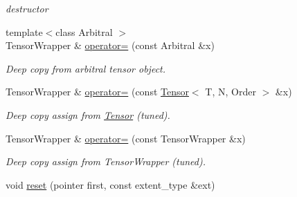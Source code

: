 \begin{DoxyCompactItemize}
\begin{DoxyCompactList}\small\item\em destructor \item\end{DoxyCompactList}\item 
\hypertarget{classbtas_1_1_tensor_wrapper_3_01_t_01_5_00_01_n_00_01_order_01_4_ae4b77e36c066a5e9b196b66b577b0e73}{
{\footnotesize template$<$class Arbitral $>$ }\\TensorWrapper \& \hyperlink{classbtas_1_1_tensor_wrapper_3_01_t_01_5_00_01_n_00_01_order_01_4_ae4b77e36c066a5e9b196b66b577b0e73}{operator=} (const Arbitral \&x)}
\label{classbtas_1_1_tensor_wrapper_3_01_t_01_5_00_01_n_00_01_order_01_4_ae4b77e36c066a5e9b196b66b577b0e73}

\begin{DoxyCompactList}\small\item\em Deep copy from arbitral tensor object. \item\end{DoxyCompactList}\item 
\hypertarget{classbtas_1_1_tensor_wrapper_3_01_t_01_5_00_01_n_00_01_order_01_4_abd7cf3c4f56c3074a17d24c98e69c0d5}{
TensorWrapper \& \hyperlink{classbtas_1_1_tensor_wrapper_3_01_t_01_5_00_01_n_00_01_order_01_4_abd7cf3c4f56c3074a17d24c98e69c0d5}{operator=} (const \hyperlink{classbtas_1_1_tensor}{Tensor}$<$ T, N, Order $>$ \&x)}
\label{classbtas_1_1_tensor_wrapper_3_01_t_01_5_00_01_n_00_01_order_01_4_abd7cf3c4f56c3074a17d24c98e69c0d5}

\begin{DoxyCompactList}\small\item\em Deep copy assign from \hyperlink{classbtas_1_1_tensor}{Tensor} (tuned). \item\end{DoxyCompactList}\item 
\hypertarget{classbtas_1_1_tensor_wrapper_3_01_t_01_5_00_01_n_00_01_order_01_4_a6c10a3dc1e81aad33abe40ca44a9b8a3}{
TensorWrapper \& \hyperlink{classbtas_1_1_tensor_wrapper_3_01_t_01_5_00_01_n_00_01_order_01_4_a6c10a3dc1e81aad33abe40ca44a9b8a3}{operator=} (const TensorWrapper \&x)}
\label{classbtas_1_1_tensor_wrapper_3_01_t_01_5_00_01_n_00_01_order_01_4_a6c10a3dc1e81aad33abe40ca44a9b8a3}

\begin{DoxyCompactList}\small\item\em Deep copy assign from TensorWrapper (tuned). \item\end{DoxyCompactList}\item 
\hypertarget{classbtas_1_1_tensor_wrapper_3_01_t_01_5_00_01_n_00_01_order_01_4_a970a0657085fb0fa54cff2396ac865d0}{
void \hyperlink{classbtas_1_1_tensor_wrapper_3_01_t_01_5_00_01_n_00_01_order_01_4_a970a0657085fb0fa54cff2396ac865d0}{reset} (pointer first, const extent\_\-type \&ext)}
\label{classbtas_1_1_tensor_wrapper_3_01_t_01_5_00_01_n_00_01_order_01_4_a970a0657085fb0fa54cff2396ac865d0}


\end{DoxyCompactItemize}

